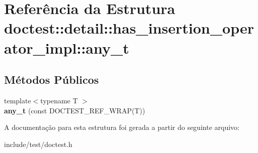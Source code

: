 \hypertarget{structdoctest_1_1detail_1_1has__insertion__operator__impl_1_1any__t}{}\section{Referência da Estrutura doctest\+:\+:detail\+:\+:has\+\_\+insertion\+\_\+operator\+\_\+impl\+:\+:any\+\_\+t}
\label{structdoctest_1_1detail_1_1has__insertion__operator__impl_1_1any__t}
\subsection*{Métodos Públicos}
\begin{DoxyCompactItemize}
\item 
\mbox{\label{structdoctest_1_1detail_1_1has__insertion__operator__impl_1_1any__t_a253f4ce5a749ffd79ae9b1c68914e69b}} 
{\footnotesize template$<$typename T $>$ }\\{\bfseries any\+\_\+t} (const D\+O\+C\+T\+E\+S\+T\+\_\+\+R\+E\+F\+\_\+\+W\+R\+AP(T))
\end{DoxyCompactItemize}


A documentação para esta estrutura foi gerada a partir do seguinte arquivo\+:\begin{DoxyCompactItemize}
\item 
include/test/doctest.\+h\end{DoxyCompactItemize}
